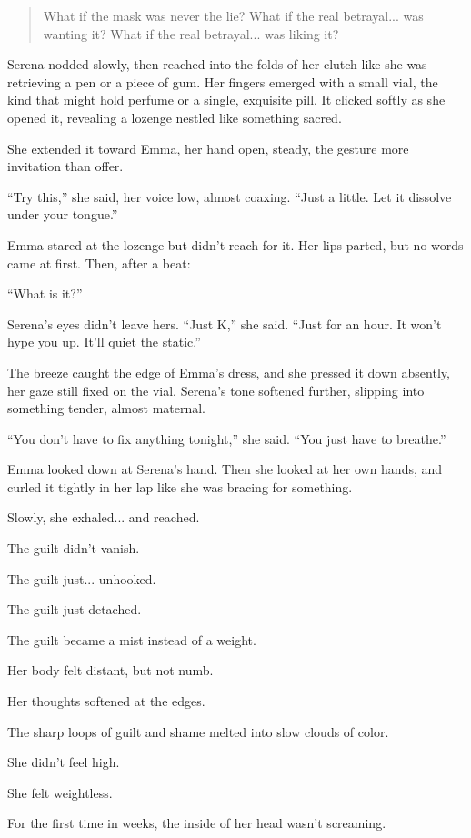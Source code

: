 \begin{quote}
What if the mask was never the lie?
What if the real betrayal... was wanting it?
What if the real betrayal... was liking it?
\end{quote}

Serena nodded slowly, then reached into the folds of her clutch like she was retrieving a pen 
or a piece of gum. Her fingers emerged with a small vial, the kind that might hold perfume or a single, 
exquisite pill. It clicked softly as she opened it, revealing a lozenge nestled like something sacred.

She extended it toward Emma, her hand open, steady, the gesture more invitation than offer.

``Try this,'' she said, her voice low, almost coaxing. ``Just a little. Let it dissolve under your tongue.''

Emma stared at the lozenge but didn’t reach for it. Her lips parted, but no words came at first. Then, 
after a beat:

``What is it?''

Serena’s eyes didn’t leave hers. ``Just K,'' she said. ``Just for an hour. It won’t hype you up. It’ll 
quiet the static.''

The breeze caught the edge of Emma’s dress, and she pressed it down absently, her gaze still fixed 
on the vial. Serena’s tone softened further, slipping into something tender, almost maternal.

``You don’t have to fix anything tonight,'' she said. ``You just have to breathe.''

Emma looked down at Serena’s hand. Then she looked at 
her own hands, and curled it tightly in her lap like she was bracing for something. 

Slowly, she exhaled...  and reached.

The guilt didn’t vanish. 

The guilt just... unhooked. 

The guilt just detached. 

The guilt became a mist instead of a weight. 

Her body felt distant, but not numb. 

Her thoughts softened at the edges. 

The sharp loops of guilt and shame melted into slow clouds of color.

She didn’t feel high.

She felt weightless.

For the first time in weeks, the inside of her head wasn’t screaming.

